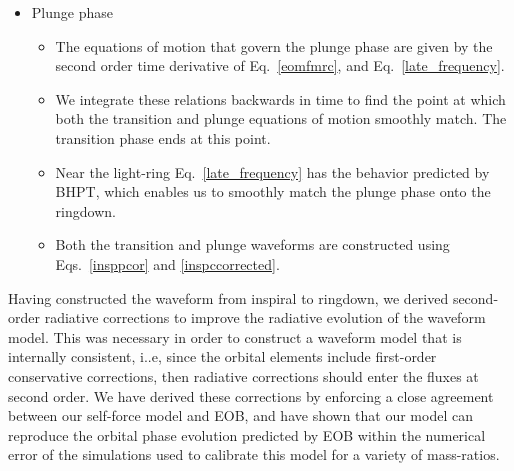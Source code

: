 \begin{itemize}
\item{Plunge phase}
\begin{itemize}
\item The equations of motion that govern the plunge phase are given by the second order time derivative of Eq.~\eqref{eomfmrc}, and Eq.~\eqref{late_frequency}.
\item We integrate these relations backwards in time to find the point at which both the transition and plunge equations of motion smoothly match. The transition phase ends at this point.
\item Near the light-ring Eq.~\eqref{late_frequency} has the behavior predicted by BHPT, which enables us to smoothly match the plunge phase onto the ringdown. %
\item Both the transition and plunge waveforms are constructed using Eqs.~\eqref{insppcor} and \eqref{inspccorrected}.
\end{itemize}
\end{itemize}

Having constructed the waveform from inspiral to ringdown, we derived second-order radiative corrections to improve the radiative evolution of the waveform model. This was necessary in order to construct a waveform model that is internally consistent, i..e, since the orbital elements include first-order conservative corrections, then radiative corrections should enter the fluxes at second order. We have derived these corrections by enforcing a close agreement between our self-force model and EOB, and have shown that our model can reproduce the orbital phase evolution predicted by EOB within the numerical error of the simulations used to calibrate this model for a variety of mass-ratios. 


